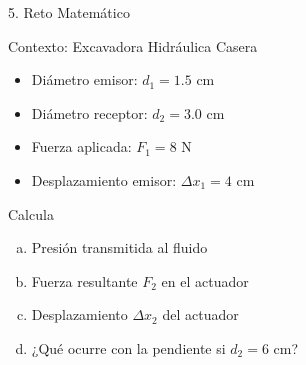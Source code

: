 \documentclass[aspectratio=169,11pt]{beamer}
\newcommand{\stepbeat}[2]{}
\begin{document}
\begin{frame}{5. Reto Matemático}
  \begin{block}{Contexto: Excavadora Hidráulica Casera}
    \begin{itemize}
      \item Diámetro emisor: $d_1 = 1.5$ cm
      \item Diámetro receptor: $d_2 = 3.0$ cm
      \item Fuerza aplicada: $F_1 = 8$ N
      \item Desplazamiento emisor: $\Delta x_1 = 4$ cm
    \end{itemize}
  \end{block}
  \only<1>{\stepbeat{frame_reto}{reto_datos}}

  \begin{exampleblock}{Calcula}
    \begin{enumerate}[a)]
      \item Presión transmitida al fluido
      \item Fuerza resultante $F_2$ en el actuador
      \item Desplazamiento $\Delta x_2$ del actuador
      \item ¿Qué ocurre con la pendiente si $d_2 = 6$ cm?
    \end{enumerate}
  \end{exampleblock}
  \only<2>{\stepbeat{frame_reto}{think_pause}}

  \only<3>{\stepbeat{frame_reto}{reto_solucion}}
\end{frame}
\end{document}
